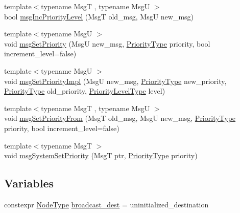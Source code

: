 \begin{DoxyCompactItemize}
\item 
{\footnotesize template$<$typename MsgT , typename MsgU $>$ }\\bool \hyperlink{namespacevt_1_1messaging_a6ee5ed1aac4e553185dc3fe80544ac2a}{msg\+Inc\+Priority\+Level} (MsgT old\+\_\+msg, MsgU new\+\_\+msg)
\item 
{\footnotesize template$<$typename MsgU $>$ }\\void \hyperlink{namespacevt_1_1messaging_ab8115ae64f9c390e7a92f3f02aea8454}{msg\+Set\+Priority} (MsgU new\+\_\+msg, \hyperlink{namespacevt_a86bff9f556eb761b27fc8600d006ac04}{Priority\+Type} priority, bool increment\+\_\+level=false)
\item 
{\footnotesize template$<$typename MsgU $>$ }\\void \hyperlink{namespacevt_1_1messaging_ad71afa970305de275db8e91a5041d8e9}{msg\+Set\+Priority\+Impl} (MsgU new\+\_\+msg, \hyperlink{namespacevt_a86bff9f556eb761b27fc8600d006ac04}{Priority\+Type} new\+\_\+priority, \hyperlink{namespacevt_a86bff9f556eb761b27fc8600d006ac04}{Priority\+Type} old\+\_\+priority, \hyperlink{namespacevt_a53e07fdb3351b0f263e0dfd51b968d5e}{Priority\+Level\+Type} level)
\item 
{\footnotesize template$<$typename MsgT , typename MsgU $>$ }\\void \hyperlink{namespacevt_1_1messaging_a9cbb4989b799eaba6ab9b8dde9e3cf14}{msg\+Set\+Priority\+From} (MsgT old\+\_\+msg, MsgU new\+\_\+msg, \hyperlink{namespacevt_a86bff9f556eb761b27fc8600d006ac04}{Priority\+Type} priority, bool increment\+\_\+level=false)
\item 
{\footnotesize template$<$typename MsgT $>$ }\\void \hyperlink{namespacevt_1_1messaging_ab609ea1ed68952c30bc8f9bba8d796b2}{msg\+System\+Set\+Priority} (MsgT ptr, \hyperlink{namespacevt_a86bff9f556eb761b27fc8600d006ac04}{Priority\+Type} priority)
\end{DoxyCompactItemize}
\subsection*{Variables}
\begin{DoxyCompactItemize}
\item 
constexpr \hyperlink{namespacevt_a866da9d0efc19c0a1ce79e9e492f47e2}{Node\+Type} \hyperlink{namespacevt_1_1messaging_a11d2b356f56486f2e60f0255cb6b05ff}{broadcast\+\_\+dest} = uninitialized\+\_\+destination
\end{DoxyCompactItemize}


